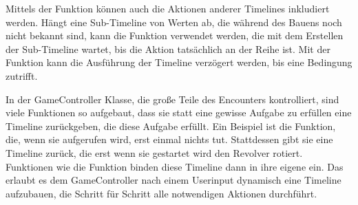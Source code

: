 Mittels der  Funktion können auch die Aktionen anderer Timelines inkludiert
werden.
Hängt eine Sub-Timeline von Werten ab, die während des Bauens noch nicht bekannt sind, kann die
 Funktion verwendet werden, die mit dem Erstellen der Sub-Timeline
wartet, bis die Aktion tatsächlich an der Reihe ist.
Mit der  Funktion kann die Ausführung der Timeline verzögert werden, bis
eine Bedingung zutrifft.

In der GameController Klasse, die große Teile des Encounters kontrolliert, sind viele Funktionen so aufgebaut, dass
sie statt eine gewisse Aufgabe zu erfüllen eine Timeline zurückgeben, die diese Aufgabe erfüllt.
Ein Beispiel ist die  Funktion, die, wenn sie aufgerufen wird, erst einmal
nichts tut.
Stattdessen gibt sie eine Timeline zurück, die erst wenn sie gestartet wird den Revolver rotiert.
Funktionen wie die  Funktion binden diese Timeline dann in ihre eigene ein.
Das erlaubt es dem GameController nach einem Userinput dynamisch eine Timeline aufzubauen, die Schritt für Schritt alle
notwendigen Aktionen durchführt.

\renewcommand{\kapitelautor}{}
